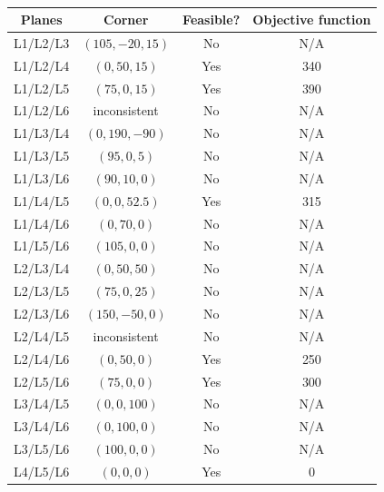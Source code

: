 \documentclass[a4paper,leqno]{article}
\numberwithin{equation}{section}
\theoremstyle{definition}
\theoremstyle{remark}
\begin{document}
\begin{table}
  \centering
  \begin{tabular}{cccc}
    \textbf{Planes} & \textbf{Corner} & \textbf{Feasible?} & \textbf{Objective function}\\\hline
    L1/L2/L3 & $ (105, -20, 15)$ & No & N/A\\
    L1/L2/L4 & $ (0,50,15) $ & Yes & 340 \\
    L1/L2/L5 & $ (75,0,15) $ & Yes & 390 \\
    L1/L2/L6 & inconsistent & No & N/A\\
    L1/L3/L4 & $ (0,190,-90) $ & No & N/A\\
    L1/L3/L5 & $ (95,0,5) $ & No & N/A \\
    L1/L3/L6 & $ (90,10,0) $ & No & N/A \\
    L1/L4/L5 & $ (0,0,52.5) $ & Yes & 315 \\
    L1/L4/L6 & $ (0,70,0) $ & No & N/A \\
    L1/L5/L6 & $ (105,0,0) $ & No & N/A \\
    L2/L3/L4 & $ (0,50,50) $ & No & N/A \\
    L2/L3/L5 & $ (75,0,25) $ & No & N/A \\
    L2/L3/L6 & $ (150,-50,0) $ & No & N/A\\
    L2/L4/L5 & inconsistent & No & N/A\\
    L2/L4/L6 & $ (0,50,0) $ & Yes & 250 \\
    L2/L5/L6 & $ (75,0,0) $ & Yes & 300 \\
    L3/L4/L5 & $ (0,0,100) $ & No & N/A \\
    L3/L4/L6 & $ (0,100,0) $ & No & N/A \\
    L3/L5/L6 & $ (100,0,0) $ & No & N/A \\
    L4/L5/L6 & $ (0,0,0) $ & Yes & 0
  \end{tabular}
  \caption{\label{tab:linprog3d}}
\end{table}
\end{document}
